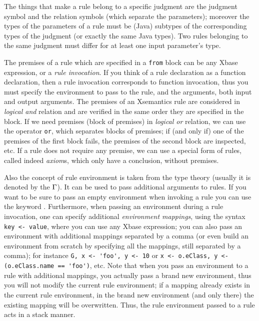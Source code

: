 The things that make a rule belong to a specific judgment are the judgment
symbol and the relation symbols (which separate the parameters); moreover the
types of the parameters of a rule must be (Java) subtypes of the corresponding types
of the judgment (or exactly the same Java types).  Two rules belonging to the
same judgment must differ for at least one input parameter's type.

The premises of a rule which are specified in a \verb|from| block can be any
Xbase expression, or a \emph{rule invocation}.  If you think of a rule
declaration as a function declaration, then a rule invocation corresponds to function invocation,
thus you must specify the environment to pass to the rule, and the arguments,
both input and output arguments.
The premises of an Xsemantics rule are considered in \emph{logical and} relation
and are verified in the same order they are specified in the block.
If we need premises (block of premises) in \emph{logical or} relation, we can
use the operator \verb|or|, which separates blocks of premises; if (and only if) one
of the premises of the first block fails, the premises of the second block are
inspected, etc.
If a rule does not require any premise, we can use a special form of
rules, called indeed \textit{axiom}s, which only have a conclusion, without
premises.

Also the concept of rule environment is taken from the type theory (usually it
is denoted by the $\Gamma$).  It can be used to pass additional arguments to rules.
If you want to be sure to pass an empty environment when invoking a rule you can
use the keyword .
Furthermore, when passing an environment during a rule invocation, one
can specify additional \emph{environment mappings}, using the syntax
\lstinline[breakatwhitespace=false,breaklines=true]!key <- value!, 
where you can use any Xbase expression;
you can also pass an environment with additional
mappings separated by a comma (or even build an environment from scratch
by specifying all the mappings, still separated by a comma); for instance
\lstinline[breakatwhitespace=false,breaklines=true]!G, x <- 'foo', y <- 10! 
or
\lstinline[breakatwhitespace=false,breaklines=true]!x <- o.eClass, y <- (o.eClass.name == 'foo')!, 
etc.
Note that when you pass an environment to a rule with additional mappings,
you actually pass a brand new environment, thus you will not modify the
current rule environment; if a mapping already exists in the current rule
environment, in the brand new environment (and only there) the existing mapping
will be overwritten.  Thus, the rule environment passed to a rule acts
in a stack manner.

